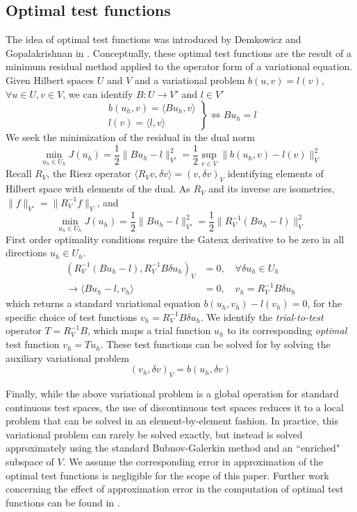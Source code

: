 \documentclass[11pt,onecolumn]{scrartcl}
\begin{document}
\subsection{Optimal test functions}
The idea of optimal test functions was introduced by Demkowicz and Gopalakrishnan in \cite{DPG2}.  Conceptually, these optimal test functions are the result of a minimum residual method applied to the operator form of a variational equation.  Given Hilbert spaces $U$ and $V$ and a variational problem $b(u,v) = l(v)$, $\forall u\in U, v\in V$, we can identify $B:U\rightarrow V'$ and $l \in V'$ 
\[
\left.\begin{array}{c}
b(u_h,v) = \langle Bu_h,v\rangle  \\
l(v) = \langle l,v\rangle
\end{array}\right\}
\Longleftrightarrow Bu_h = l
\]
We seek the minimization of the residual in the dual norm
\[
\min_{u_h\in U_h} J(u_h) = \frac{1}{2}\|Bu_h-l\|_{V'}^2 = \frac{1}{2} \sup_{v\in V} \| b(u_h,v)-l(v)\|_{V}^2
\]
Recall $R_V$, the Riesz operator $\langle R_V v,\delta v\rangle = (v, \delta v)_V$ identifying elements of Hilbert space with elements of the dual.  As $R_V$ and its inverse are isometries, $\|f\|_{V'} = \|R_V^{-1} f\|_V$, and 
\[
\min_{u_h\in U_h} J(u_h) = \frac{1}{2}\|Bu_h-l\|_{V'}^2 =  \frac{1}{2}\|R_V^{-1}(Bu_h-l)\|_V^2
\]
First order optimality conditions require the Gateux derivative to be zero in all directions $u_h \in U_h$.  
\begin{align*}
\left(R_V^{-1}(Bu_h-l),R_V^{-1}B\delta u_h\right)_V &= 0, \quad \forall \delta u_h \in U_h \\
\rightarrow \langle Bu_h-l, v_h\rangle &= 0, \quad v_h = R_V^{-1}B\delta u_h
\end{align*}
which returns a standard variational equation $b(u_h,v_h) - l(v_h) = 0$, for the specific choice of test functions $v_h = R_V^{-1}B\delta u_h$.  We identify the \textit{trial-to-test} operator $T = R_V^{-1}B$, which maps a trial function $u_h$ to its corresponding \textit{optimal} test function $v_h = Tu_h$.  These test functions can be solved for by solving the auxiliary variational problem
\[
\left(v_h,\delta v\right)_V = b(u_h,\delta v)
\]

Finally, while the above variational problem is a global operation for standard continuous test spaces, the use of discontinuous test spaces reduces it to a local problem that can be solved in an element-by-element fashion.  In practice, this variational problem can rarely be solved exactly, but instead is solved approximately using the standard Bubnov-Galerkin method and an ``enriched" subspace of $V$. We assume the corresponding error in approximation of the optimal test functions is negligible for the scope of this paper.  Further work concerning the effect of approximation error in the computation of optimal test functions can be found in \cite{practicalDPG}.
\end{document}
